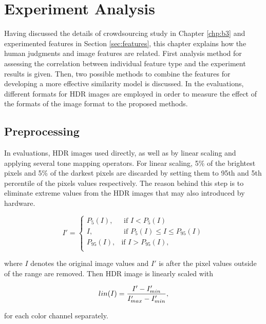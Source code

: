 \chapter{Experiment Analysis}
\label{chp:b4}
Having discussed the details of crowdsourcing study in Chapter \ref{chp:b3} and experimented features in Section \ref{sec:features}, this chapter explains how the human judgments and image features are related. First analysis method for assessing the correlation between individual feature type and the experiment results is given. Then, two possible methods to combine the features for developing a more effective similarity model is discussed. In the evaluations, different formats for HDR images are employed in order to measure the effect of the formats of the image format to the proposed methods. 

\section{Preprocessing}
In evaluations, HDR images used directly, as well as by linear scaling and applying several tone mapping operators. For linear scaling, 5\% of the brightest pixels and 5\% of the darkest pixels are discarded by setting them to 95th and 5th percentile of the pixels values respectively. The reason behind this step is to eliminate extreme values from the HDR images that may also introduced by hardware. 

\begin{equation}
    I' = \begin{cases}
    P_5 (I), &\text{ if $I < P_5(I)$} \\
    I, &\text{ if $P_5(I) \leq I \leq P_{95}(I) $} \\
    P_{95}(I), &\text{if $I > P_{95}(I)$}, \\
    \end{cases}
\end{equation}

where $I$ denotes the original image values and $I'$ is after the pixel values outside of the range are removed. Then HDR image is linearly scaled with

\begin{equation}
    lin(I)  = {{I' - I'_{min}} \over {I'_{max} - I'_{min}}}, 
\end{equation}

for each color channel separately.

